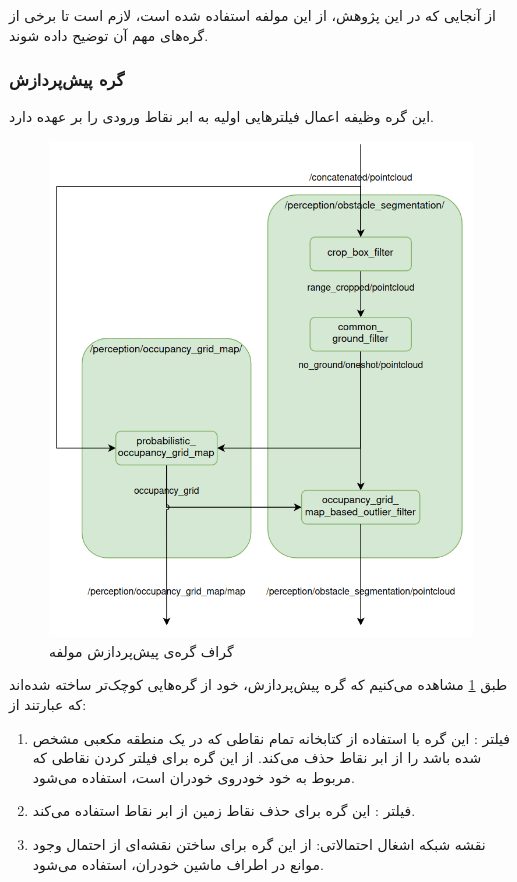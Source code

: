 از آنجایی که در این پژوهش، از این مولفه استفاده شده است، لازم است تا برخی از گره‌های مهم آن توضیح داده شوند.

\subsubsection{گره پیش‌پردازش}
این گره وظیفه اعمال فیلترهایی اولیه به ابر نقاط ورودی را بر عهده دارد. 

\begin{figure}[h!]
    \centering
    \includegraphics[width=0.45\linewidth]{figures/Autoware_Perception_Preprocessing_Node_Graph.png}
    \caption{ گراف گره‌ی پیش‌پردازش مولفه  \cite{Autoware:Documentation}}
\label{fig:Autoware_Perception_Preprocessing_Node_Graph}
\end{figure}

طبق \cref{fig:Autoware_Perception_Preprocessing_Node_Graph} مشاهده می‌کنیم که گره پیش‌پردازش، خود از گره‌هایی کوچک‌تر ساخته شده‌اند که عبارتند از:
\begin{enumerate}
    \item فیلتر : این گره با استفاده از کتابخانه  تمام نقاطی که در یک منطقه مکعبی مشخص شده باشد را از ابر نقاط حذف می‌کند. از این گره برای فیلتر کردن نقاطی که مربوط به خود خودروی  خودران است، استفاده می‌شود.
    \item فیلتر :‌ این گره برای حذف نقاط زمین از ابر نقاط استفاده می‌کند. 
    \item نقشه شبکه اشغال احتمالاتی: از این گره برای ساختن نقشه‌ای از احتمال وجود موانع در اطراف ماشین خودران، استفاده می‌شود.
\end{enumerate}

